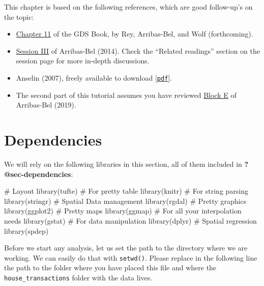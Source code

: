 \documentclass[
  letterpaper,
  krantz2]{style/krantz}
\newenvironment{Shaded}{\begin{snugshade}}{\end{snugshade}}
\newcommand{\CommentTok}[1]{\textcolor[rgb]{0.37,0.37,0.37}{#1}}
\newcommand{\FunctionTok}[1]{\textcolor[rgb]{0.28,0.35,0.67}{#1}}
\newcommand{\NormalTok}[1]{\textcolor[rgb]{0.00,0.23,0.31}{#1}}
\providecommand{\tightlist}{%
  \setlength{\itemsep}{0pt}\setlength{\parskip}{0pt}}\usepackage{longtable,booktabs,array}
\begin{document}
This chapter is based on the following references, which are good
follow-up's on the topic:

\begin{itemize}
\tightlist
\item
  \href{https://geographicdata.science/book/notebooks/11_regression.html}{Chapter
  11} of the GDS Book, by Rey, Arribas-Bel, and Wolf (forthcoming).
\item
  \href{http://darribas.org/sdar_mini/notes/Class_03.html}{Session III}
  of Arribas-Bel (2014). Check the ``Related readings'' section on the
  session page for more in-depth discussions.
\item
  Anselin (2007), freely available to download
  {[}\href{https://dces.wisc.edu/wp-content/uploads/sites/128/2013/08/W14_Anselin2007.pdf}{\texttt{pdf}}{]}.
\item
  The second part of this tutorial assumes you have reviewed
  \href{https://darribas.org/gds_course/content/bE/concepts_E.html}{Block
  E} of Arribas-Bel (2019).
\end{itemize}

\hypertarget{dependencies-3}{%
\section{Dependencies}\label{dependencies-3}}

We will rely on the following libraries in this section, all of them
included in \textbf{?@sec-dependencies}:

\begin{Shaded}
\begin{Highlighting}[]
\CommentTok{\# Layout}
\FunctionTok{library}\NormalTok{(tufte)}
\CommentTok{\# For pretty table}
\FunctionTok{library}\NormalTok{(knitr)}
\CommentTok{\# For string parsing}
\FunctionTok{library}\NormalTok{(stringr)}
\CommentTok{\# Spatial Data management}
\FunctionTok{library}\NormalTok{(rgdal)}
\CommentTok{\# Pretty graphics}
\FunctionTok{library}\NormalTok{(ggplot2)}
\CommentTok{\# Pretty maps}
\FunctionTok{library}\NormalTok{(ggmap)}
\CommentTok{\# For all your interpolation needs}
\FunctionTok{library}\NormalTok{(gstat)}
\CommentTok{\# For data manipulation}
\FunctionTok{library}\NormalTok{(dplyr)}
\CommentTok{\# Spatial regression}
\FunctionTok{library}\NormalTok{(spdep)}
\end{Highlighting}
\end{Shaded}

Before we start any analysis, let us set the path to the directory where
we are working. We can easily do that with \texttt{setwd()}. Please
replace in the following line the path to the folder where you have
placed this file and where the \texttt{house\_transactions} folder with
the data lives.
\end{document}
